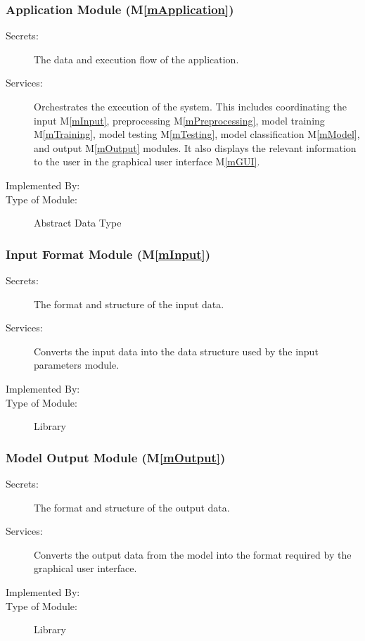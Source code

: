 \documentclass[12pt, titlepage]{article}
\newcommand{\mref}[1]{M\ref{#1}}
\begin{document}
\subsubsection{Application Module (\mref{mApplication})}

\begin{description}
\item[Secrets:] The data and execution flow of the application.
\item[Services:] Orchestrates the execution of the system. This includes
coordinating the input \mref{mInput}, preprocessing \mref{mPreprocessing},
model training \mref{mTraining}, model testing \mref{mTesting}, model
classification \mref{mModel}, and output \mref{mOutput} modules. It also
displays the relevant information to the user in the graphical user interface
\mref{mGUI}.
\item[Implemented By:] \progname{}
\item[Type of Module:] Abstract Data Type
\end{description}

\subsubsection{Input Format Module (\mref{mInput})}

\begin{description}
\item[Secrets:]The format and structure of the input data.
\item[Services:]Converts the input data into the data structure used by the
  input parameters module.
\item[Implemented By:] \progname{}
\item[Type of Module:] Library
\end{description}

\subsubsection{Model Output Module (\mref{mOutput})}

\begin{description}
\item[Secrets:] The format and structure of the output data.
\item[Services:] Converts the output data from the model into the format
required by the graphical user interface.
\item[Implemented By:] \progname{}
\item[Type of Module:] Library
\end{description}
\end{document}
